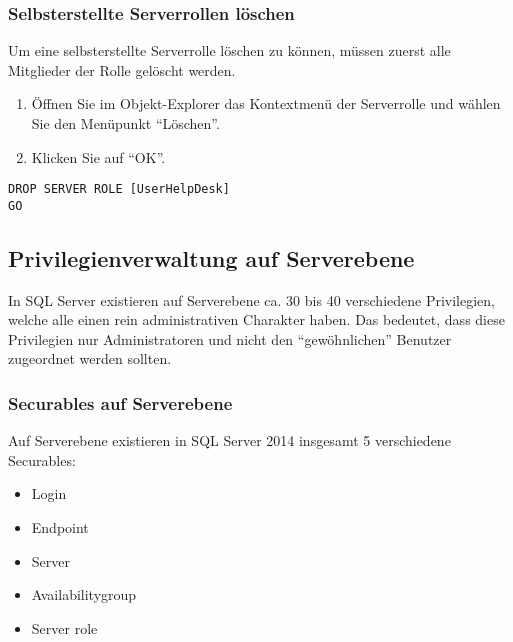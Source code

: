         \subsubsection{Selbsterstellte Serverrollen löschen}
          Um eine selbsterstellte Serverrolle löschen zu können, müssen zuerst
          alle Mitglieder der Rolle gelöscht werden.
          \begin{enumerate}
            \item Öffnen Sie im Objekt-Explorer das Kontextmenü der Serverrolle
            und wählen Sie den Menüpunkt \enquote{Löschen}.
            \item Klicken Sie auf \enquote{OK}.
          \end{enumerate}
          \begin{lstlisting}[language=ms_sql,caption={Entfernen einer
          Serverrolle},label=sql19_04]
DROP SERVER ROLE [UserHelpDesk]
GO
          \end{lstlisting}
          \begin{literaturinternet}
            \item \cite{ee677643}
          \end{literaturinternet}
      \subsection{Privilegienverwaltung auf Serverebene}
        In SQL Server existieren auf Serverebene ca. 30 bis 40 verschiedene
        Privilegien, welche alle einen rein administrativen Charakter haben. Das
        bedeutet, dass diese Privilegien nur Administratoren und nicht den
        \enquote{gewöhnlichen} Benutzer zugeordnet werden sollten.
        \subsubsection{Securables auf Serverebene}
          Auf Serverebene existieren in SQL Server 2014 insgesamt 5 verschiedene
          Securables:
          \begin{itemize}
            \item Login
            \item Endpoint
            \item Server
            \item Availabilitygroup
            \item Server role
          \end{itemize}
